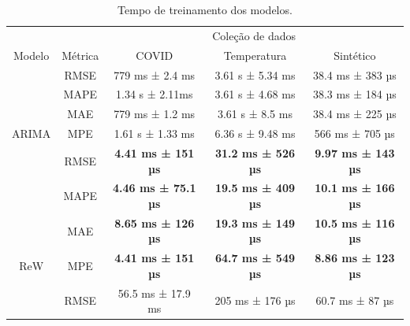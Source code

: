 \begin{table}[htbp]
    \caption{Tempo de treinamento dos modelos.}\label{tab:tempo_ajuste}
    \centering
    \begin{tabular}{@{}ccccc@{}} \toprule
                                  &                           & \multicolumn{3}{c}{Coleção de dados}                                                                                       \\ \cmidrule{3-5}
        \multirow{-2}{*}{Modelo}  & \multirow{-2}{*}{Métrica} & \multicolumn{1}{c}{COVID}                      & \multicolumn{1}{c}{Temperatura}               & Sintético                 \\ \midrule
                                  & RMSE                      & \multicolumn{1}{c}{779 ms ± 2.4 ms}            & \multicolumn{1}{c}{3.61 s ± 5.34 ms}          & 38.4 ms ± 383 µs          \\
                                  & MAPE                      & \multicolumn{1}{c}{1.34 s ± 2.11ms}            & \multicolumn{1}{c}{3.61 s ± 4.68 ms}          & 38.3 ms ± 184 µs          \\
                                  & MAE                       & \multicolumn{1}{c}{779 ms ± 1.2 ms}            & \multicolumn{1}{c}{3.61 s ± 8.5 ms}           & 38.4 ms ± 225 µs          \\
        \multirow{-4}{*}{ARIMA}   & MPE                       & \multicolumn{1}{c}{1.61 s ± 1.33 ms}           & \multicolumn{1}{c}{6.36 s ± 9.48 ms}          & 566 ms ± 705 µs           \\ \midrule
                                  & RMSE                      & \multicolumn{1}{c}{\textbf{4.41 ms ± 151 µs}}  & \multicolumn{1}{c}{\textbf{31.2 ms ± 526 µs}} & \textbf{9.97 ms ± 143 µs} \\
                                  & MAPE                      & \multicolumn{1}{c}{\textbf{4.46 ms ± 75.1 µs}} & \multicolumn{1}{c}{\textbf{19.5 ms ± 409 µs}} & \textbf{10.1 ms ± 166 µs} \\
                                  & MAE                       & \multicolumn{1}{c}{\textbf{8.65 ms ± 126 µs}}  & \multicolumn{1}{c}{\textbf{19.3 ms ± 149 µs}} & \textbf{10.5 ms ± 116 µs} \\
        \multirow{-4}{*}{ReW}     & MPE                       & \multicolumn{1}{c}{\textbf{4.41 ms ± 151 µs}}  & \multicolumn{1}{c}{\textbf{64.7 ms ± 549 µs}} & \textbf{8.86 ms ± 123 µs} \\ \midrule
                                  & RMSE                      & \multicolumn{1}{c}{56.5 ms ± 17.9 ms}          & \multicolumn{1}{c}{205 ms ± 176 µs}           & 60.7 ms ± 87 µs           \\

\end{tabular}
\end{table}
